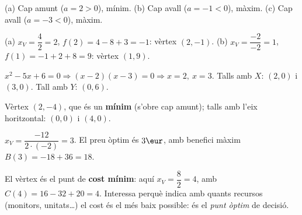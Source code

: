 \begin{solucions}
\begin{sollist}
  \item (a) Cap amunt ($a=2>0$), mínim. \quad (b) Cap avall ($a=-1<0$), màxim. \quad
        (c) Cap avall ($a=-3<0$), màxim.
  \item (a) $x_V=\dfrac{4}{2}=2$, $f(2)=4-8+3=-1$: vèrtex $(2,-1)$. \quad
        (b) $x_V=\dfrac{-2}{-2}=1$, $f(1)=-1+2+8=9$: vèrtex $(1,9)$.
  \item $x^2-5x+6=0 \Rightarrow (x-2)(x-3)=0 \Rightarrow x=2,\ x=3$. Talls amb $X$:
        $(2,0)$ i $(3,0)$. Tall amb $Y$: $(0,6)$.
  \item Vèrtex $(2,-4)$, que és un \textbf{mínim} (s'obre cap amunt); talls amb l'eix
        horitzontal: $(0,0)$ i $(4,0)$.
  \item $x_V=\dfrac{-12}{2\cdot(-2)}=3$. El preu òptim és $3\eur$, amb benefici màxim
        $B(3)=-18+36=18$.
  \item El vèrtex és el punt de \textbf{cost mínim}: aquí $x_V=\dfrac{8}{2}=4$, amb
        $C(4)=16-32+20=4$. Interessa perquè indica amb quants recursos (monitors,
        unitats…) el cost és el més baix possible: és el \emph{punt òptim} de decisió.
\end{sollist}
\end{solucions}

